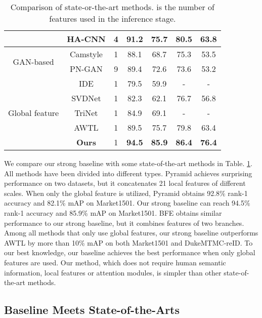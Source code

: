\documentclass[journal]{IEEEtran}
\begin{document}
\begin{table}[tb]
\begin{center}
\begin{tabular}{ ccc|cc|cc}
                                & HA-CNN \cite{li2018harmonious}    & 4 & 91.2	& 75.7	&80.5	&63.8		\\
    \hline
    \multirow{2}{1cm}{GAN-based}& Camstyle \cite{zhong2019camstyle} &  1 &88.1 	&68.7	&75.3	&53.5		\\
                                & PN-GAN \cite{qian2018pose}        &  9 &89.4 	&72.6	&73.6	&53.2		\\
    \hline
    \multirow{5}{1cm}{Global feature}& IDE \cite{zheng2018discriminatively}  & 1  & 79.5	& 59.9	& -	&-		\\
                                & SVDNet \cite{sun2017svdnet}  & 1  & 82.3	& 62.1	& 76.7	&56.8		\\
                                & TriNet\cite{hermans2017defense}  & 1  & 84.9	& 69.1	& -	& -		\\
                                & AWTL\cite{ristani2018features}  & 1  & 89.5	& 75.7	& 79.8	& 63.4		\\
                                & \textbf{Ours}    &  1 &\textbf{94.5}	&\textbf{85.9}	&\textbf{86.4}	&\textbf{76.4}		\\
\hline
  \end{tabular}
  \end{center}
  \caption{\label{tab:sota}Comparison of state-or-the-art methods.  is the number of features used in the inference stage.}
\end{table}

We compare our strong baseline with some state-of-the-art methods in Table. \ref{tab:sota}.
All methods have been divided into different types.
Pyramid\cite{zheng2018coarse} achieves surprising performance on two datasets, but it concatenates 21 local features of different scales. When only the global feature is utilized, Pyramid obtains 92.8\% rank-1 accuracy and 82.1\% mAP on Market1501. Our strong baseline can reach 94.5\% rank-1 accuracy and 85.9\% mAP on Market1501.
BFE\cite{dai2018batch} obtains similar performance to our strong baseline, but it combines features of two branches.
Among all methods that only use global features, our strong baseline outperforms AWTL\cite{ristani2018features} by more than 10\% mAP on both Market1501 and DukeMTMC-reID.
To our best knowledge, our baseline achieves the best performance when only global features are used.
Our method, which does not require human semantic information, local features or attention modules, is simpler than other state-of-the-art methods.

\subsection{Baseline Meets State-of-the-Arts}
\end{document}
